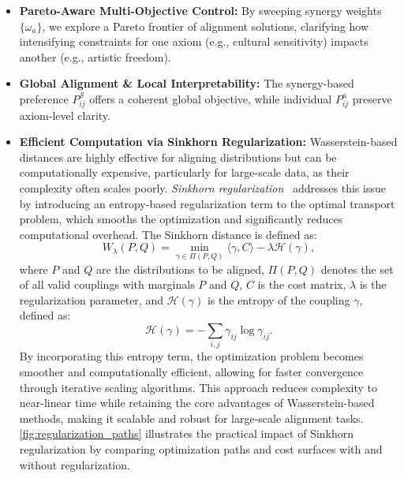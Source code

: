 \begin{itemize}
    \item \textbf{Pareto-Aware Multi-Objective Control:} 
    By sweeping synergy weights \(\{\omega_a\}\), we explore a Pareto frontier of alignment solutions, clarifying how intensifying constraints for one axiom (e.g., cultural sensitivity) impacts another (e.g., artistic freedom).

    \item \textbf{Global Alignment \& Local Interpretability:} 
    The synergy-based preference \(P_{ij}^{\mathcal{S}}\) offers a coherent global objective, while individual \(P_{ij}^a\) preserve axiom-level clarity.

    \item \textbf{Efficient Computation via Sinkhorn Regularization:}  
    Wasserstein-based distances are highly effective for aligning distributions but can be computationally expensive, particularly for large-scale data, as their complexity often scales poorly. \emph{Sinkhorn regularization}~\cite{cuturi2013sinkhorn} addresses this issue by introducing an entropy-based regularization term to the optimal transport problem, which smooths the optimization and significantly reduces computational overhead. The Sinkhorn distance is defined as:  
\[
W_\lambda(P, Q) = \min_{\gamma \in \Pi(P, Q)} \langle \gamma, C \rangle - \lambda \mathcal{H}(\gamma),
\]
where \(P\) and \(Q\) are the distributions to be aligned, \(\Pi(P, Q)\) denotes the set of all valid couplings with marginals \(P\) and \(Q\), \(C\) is the cost matrix, \(\lambda\) is the regularization parameter, and \(\mathcal{H}(\gamma)\) is the entropy of the coupling \(\gamma\), defined as:
\[
\mathcal{H}(\gamma) = - \sum_{i, j} \gamma_{ij} \log \gamma_{ij}.
\]
By incorporating this entropy term, the optimization problem becomes smoother and computationally efficient, allowing for faster convergence through iterative scaling algorithms. This approach reduces complexity to near-linear time while retaining the core advantages of Wasserstein-based methods, making it scalable and robust for large-scale alignment tasks. \cref{fig:regularization_paths} illustrates the practical impact of Sinkhorn regularization by comparing optimization paths and cost surfaces with and without regularization.


\end{itemize}



